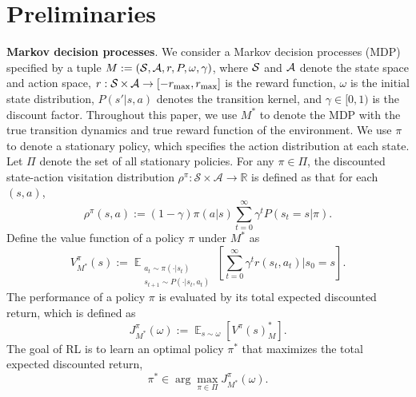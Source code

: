 \section{Preliminaries}
\label{sec:prelim}
\textbf{Markov decision processes}. We consider a Markov decision processes (MDP) specified by a tuple $M:=(\operatorname{\mathcal{S}}, \operatorname{\mathcal{A}}, r, P, \omega, \gamma)$, where $\operatorname{\mathcal{S}}$ and $\operatorname{\mathcal{A}}$ denote the state space and action space, $r: \operatorname{\mathcal{S}}\times \operatorname{\mathcal{A}} \rightarrow [-r_{\max}, r_{\max}]$ is the reward function, $\omega$ is the initial state distribution, $P(s'\rvert s,a)$ denotes the transition kernel, and $\gamma\in [0,1)$ is the discount factor. Throughout this paper, we use $M^*$ to denote the MDP with the true transition dynamics and true reward function of the environment. We use $\pi$ to denote a stationary policy, which specifies the action distribution at each state. Let $\Pi$ denote the set of all stationary policies. 
For any $\pi \in \Pi$, the discounted state-action visitation distribution $\rho^\pi: \mathcal{S} \times \mathcal{A} \rightarrow \mathbb{R}$ is defined as that for each $(s,a)$,
\begin{equation}
   \rho^\pi(s,a):= (1-\gamma) \pi(a\rvert s) \sum_{t=0}^{\infty} \gamma^t P(s_t=s\rvert \pi).  
\end{equation}
Define the value function of a policy $\pi$ under $M^*$ as
\begin{equation}
V^\pi_{M^*}(s):= \displaystyle\mathop{\mathbb{E}}_{\substack{a_t\sim\pi(\cdot\rvert s_t)\\ s_{t+1}\sim P(\cdot\rvert s_t,a_t)}}\left[\sum_{t=0}^{\infty} \gamma^t r(s_t,a_t) \Big\rvert s_0=s \right].
\end{equation}
The performance of a policy $\pi$ is evaluated by its total expected discounted return, which is defined as
\begin{equation}
J^\pi_{M^*}(\omega):= \displaystyle\mathop{\mathbb{E}}_{s\sim\omega}\left[V^\pi(s)_M^*\right].
\end{equation}
The goal of RL is to learn an optimal policy $\pi^*$ that maximizes the total expected discounted return, \ie
\begin{equation}
  \pi^* \in \arg\max_{\pi\in \Pi} J^\pi_{M^*}(\omega).
\end{equation}


